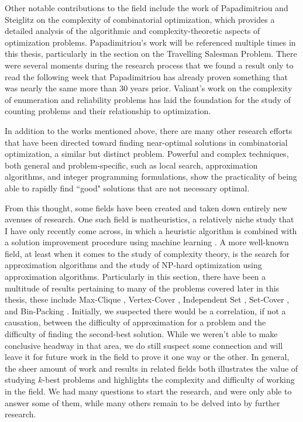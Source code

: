 Other notable contributions to the field include the work of Papadimitriou and Steiglitz \cite{papadimitriou1982complexity} on the complexity of combinatorial optimization, which provides a detailed analysis of the algorithmic and complexity-theoretic aspects of optimization problems. Papadimitriou's work will be referenced multiple times in this thesis, particularly in the section on the Travelling Salesman Problem. There were several moments during the research process that we found a result only to read the following week that Papadimitriou has already proven something that was nearly the same more than 30 years prior. Valiant's work \cite{valiant1979complexity} on the complexity of enumeration and reliability problems has laid the foundation for the study of counting problems and their relationship to optimization.

In addition to the works mentioned above, there are many other research efforts that have been directed toward finding near-optimal solutions in combinatorial optimization, a similar but distinct problem. Powerful and complex techniques, both general and problem-specific, such as local search, approximation algorithms, and integer programming formulations, show the practicality of being able to rapidly find ``good" solutions that are not necessary optimal.

From this thought, some fields have been created and taken down entirely new avenues of research. One such field is matheuristics, a relatively niche study that I have only recently come across, in which a heuristic algorithm is combined with a solution improvement procedure using machine learning \cite{de2023mathematical}. A more well-known field, at least when it comes to the study of complexity theory, is the search for approximation algorithms and the study of NP-hard optimization using approximation algorithms. Particularly in this section, there have been a multitude of results pertaining to many of the problems covered later in this thesis, these include Max-Clique \cite{uriel2004approx}, Vertex-Cover \cite{karakostas2009better}, Independent Set \cite{chalermsook2023polynomial, berman1994approximating}, Set-Cover \cite{shi2019approx}, and Bin-Packing \cite{zhang2000linear}. Initially, we suspected there would be a correlation, if not a causation, between the difficulty of approximation for a problem and the difficulty of finding the second-best solution. While we weren't able to make conclusive headway in that area, we do still suspect some connection and will leave it for future work in the field to prove it one way or the other. In general, the sheer amount of work and results in related fields both illustrates the value of studying $k$-best problems and highlights the complexity and difficulty of working in the field. We had many questions to start the research, and were only able to answer some of them, while many others remain to be delved into by further research.  

